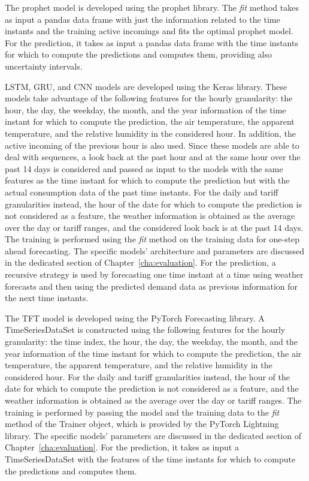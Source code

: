 The prophet model is developed using the prophet library.
The \emph{fit} method takes as input a pandas data frame with just the information related to the time instants and the training active incomings and fits the optimal prophet model.
For the prediction, it takes as input a pandas data frame with the time instants for which to compute the predictions and computes them, providing also uncertainty intervals.

LSTM, GRU, and CNN models are developed using the Keras library.
These models take advantage of the following features for the hourly granularity: the hour, the day, the weekday, the month, and the year information of the time instant for which to compute the prediction, the air temperature, the apparent temperature, and the relative humidity in the considered hour.
In addition, the active incoming of the previous hour is also used.
Since these models are able to deal with sequences, a look back at the past hour and at the same hour over the past 14 days is considered and passed as input to the models with the same features as the time instant for which to compute the prediction but with the actual consumption data of the past time instants.
For the daily and tariff granularities instead, the hour of the date for which to compute the prediction is not considered as a feature, the weather information is obtained as the average over the day or tariff ranges, and the considered look back is at the past 14 days.
The training is performed using the \emph{fit} method on the training data for one-step ahead forecasting.
The specific models' architecture and parameters are discussed in the dedicated section of Chapter~\ref{cha:evaluation}.
For the prediction, a recursive strategy is used by forecasting one time instant at a time using weather forecasts and then using the predicted demand data as previous information for the next time instants.

The TFT model is developed using the PyTorch Forecasting library.
A TimeSeriesDataSet is constructed using the following features for the hourly granularity: the time index, the hour, the day, the weekday, the month, and the year information of the time instant for which to compute the prediction, the air temperature, the apparent temperature, and the relative humidity in the considered hour.
For the daily and tariff granularities instead, the hour of the date for which to compute the prediction is not considered as a feature, and the weather information is obtained as the average over the day or tariff ranges.
The training is performed by passing the model and the training data to the \emph{fit} method of the Trainer object, which is provided by the PyTorch Lightning library.
The specific models' parameters are discussed in the dedicated section of Chapter~\ref{cha:evaluation}.
For the prediction, it takes as input a TimeSeriesDataSet with the features of the time instants for which to compute the predictions and computes them.

